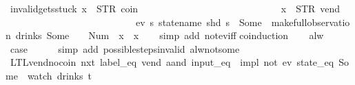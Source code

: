 \begin{isabellebody}
\endisatagproof
{\isafoldproof}%
%
\isadelimproof
\isanewline
%
\endisadelimproof
\isanewline
{}\isamarkupfalse%
\ invalid{\isacharunderscore}gets{\isacharunderscore}stuck{\isacharcolon}\ {\isachardoublequoteopen}x{}\ {\isasymnoteq}\ {\isacharparenleft}STR\ {\isacharprime}{\isacharprime}coin{\isacharprime}{\isacharprime}{\isacharcomma}\ {\isacharbrackleft}{\isacharbrackright}{\isacharparenright}\ {\isasymLongrightarrow}\isanewline
\ \ \ \ \ \ \ \ \ \ \ \ \ \ \ \ \ \ \ \ \ \ \ \ \ \ \ x{}\ {\isasymnoteq}\ {\isacharparenleft}STR\ {\isacharprime}{\isacharprime}vend{\isacharprime}{\isacharprime}{\isacharcomma}\ {\isacharbrackleft}{\isacharbrackright}{\isacharparenright}\ {\isasymLongrightarrow}\isanewline
\ \ \ \ \ \ \ \ \ \ \ \ \ \ \ \ \ \ \ \ \ \ \ \ \ \ \ {\isasymnot}ev\ {\isacharparenleft}{\isasymlambda}s{\isachardot}\ statename\ {\isacharparenleft}shd\ s{\isacharparenright}\ {\isacharequal}\ Some\ {}{\isacharparenright}\ {\isacharparenleft}make{\isacharunderscore}full{\isacharunderscore}observation\ drinks\ {\isacharparenleft}Some\ {}{\isacharparenright}\ {\isacharparenleft}{\isacharless}{\isachargreater}{\isacharparenleft}{}\ {\isacharcolon}{\isacharequal}\ Num\ {}{\isacharparenright}{\isacharparenright}\ {\isacharparenleft}x{}\ {\isacharhash}{\isacharhash}\ x{}{\isacharparenright}{\isacharparenright}{\isachardoublequoteclose}\isanewline
%
\isadelimproof
\ \ %
\endisadelimproof
%
\isatagproof
{}\isamarkupfalse%
\ {\isacharparenleft}simp\ add{\isacharcolon}\ not{\isacharunderscore}ev{\isacharunderscore}iff{\isacharparenright}\isanewline
{}\isamarkupfalse%
{\isacharparenleft}coinduction{\isacharparenright}\isanewline
\ \ \isamarkupfalse%
\ alw\isanewline
\ \ \isamarkupfalse%
\ \isamarkupfalse%
\ {\isacharquery}case\isanewline
\ \ \ \ \isamarkupfalse%
\ {\isacharparenleft}simp\ add{\isacharcolon}\ possible{\isacharunderscore}steps{\isacharunderscore}{}{\isacharunderscore}invalid\ alw{\isacharunderscore}not{\isacharunderscore}some{\isacharparenright}\isanewline
{}\isamarkupfalse%
%
\endisatagproof
{\isafoldproof}%
%
\isadelimproof
\isanewline
%
\endisadelimproof
\isanewline
{}\isamarkupfalse%
\ LTL{\isacharunderscore}vend{\isacharunderscore}no{\isacharunderscore}coin{\isacharcolon}\ {\isachardoublequoteopen}{\isacharparenleft}{\isacharparenleft}nxt\ {\isacharparenleft}label_eq\ {\isacharprime}{\isacharprime}vend{\isacharprime}{\isacharprime}\ aand\ input_eq\ {\isacharbrackleft}{\isacharbrackright}{\isacharparenright}{\isacharparenright}\ impl\ not\ {\isacharparenleft}ev\ {\isacharparenleft}state_eq\ {\isacharparenleft}Some\ {}{\isacharparenright}{\isacharparenright}{\isacharparenright}{\isacharparenright}\ {\isacharparenleft}watch\ drinks\ t{\isacharparenright}{\isachardoublequoteclose}\isanewline

\end{isabellebody}

